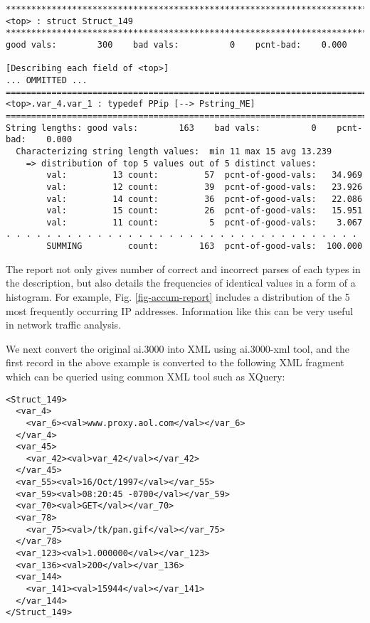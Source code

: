 \documentclass{sig-alternate-sigmod08}
\begin{document}
\begin{figure*}
\begin{center}
{\small
\begin{verbatim}
*****************************************************************************************************
<top> : struct Struct_149
*****************************************************************************************************
good vals:        300    bad vals:          0    pcnt-bad:    0.000

[Describing each field of <top>]
... OMMITTED ...
=====================================================================================================
<top>.var_4.var_1 : typedef PPip [--> Pstring_ME]
=====================================================================================================
String lengths: good vals:        163    bad vals:          0    pcnt-bad:    0.000
  Characterizing string length values:  min 11 max 15 avg 13.239
    => distribution of top 5 values out of 5 distinct values:
        val:         13 count:         57  pcnt-of-good-vals:   34.969
        val:         12 count:         39  pcnt-of-good-vals:   23.926
        val:         14 count:         36  pcnt-of-good-vals:   22.086
        val:         15 count:         26  pcnt-of-good-vals:   15.951
        val:         11 count:          5  pcnt-of-good-vals:    3.067
. . . . . . . . . . . . . . . . . . . . . . . . . . . . . . . . . . .
        SUMMING         count:        163  pcnt-of-good-vals:  100.000

\end{verbatim}
}
\caption{Portions of accumulator report}\label{fig-accum-report}
\end{center}
\end{figure*}

The report not only gives number of correct and incorrect parses of
each \pads{} types in the description, but also details the frequencies
of identical values in a form of a histogram. For example, Fig. \ref{fig-accum-report}
includes a distribution of the 5 most frequently occurring IP addresses.
Information like this can be very useful in network traffic analysis.

We next convert the original ai.3000 into XML using ai.3000-xml tool,
and the first record in the above example is converted to the following
XML fragment which can be queried using common XML tool such as XQuery:

{\small
\begin{verbatim}
<Struct_149>
  <var_4>
    <var_6><val>www.proxy.aol.com</val></var_6>
  </var_4>
  <var_45>
    <var_42><val>var_42</val></var_42>
  </var_45>
  <var_55><val>16/Oct/1997</val></var_55>
  <var_59><val>08:20:45 -0700</val></var_59>
  <var_70><val>GET</val></var_70>
  <var_78>
    <var_75><val>/tk/pan.gif</val></var_75>
  </var_78>
  <var_123><val>1.000000</val></var_123>
  <var_136><val>200</val></var_136>
  <var_144>
    <var_141><val>15944</val></var_141>
  </var_144>
</Struct_149>
\end{verbatim}
}
\end{document}
